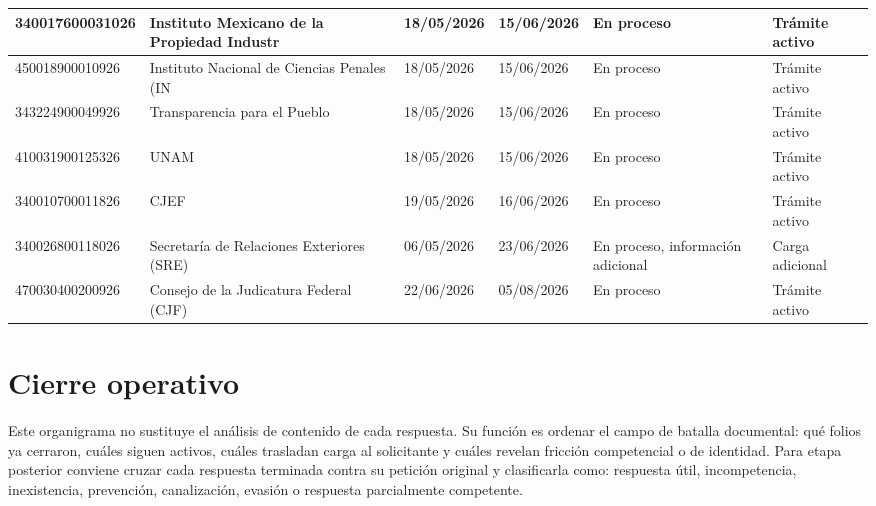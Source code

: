 \documentclass[10pt,letterpaper]{article}
\begin{document}
\begin{longtable}{|p{3.0cm}|p{4.2cm}|p{2.2cm}|p{2.2cm}|p{3.8cm}|p{4.2cm}|}
340017600031026 & Instituto Mexicano de la Propiedad Industr & 18/05/2026 & 15/06/2026 & En proceso & Trámite activo \\ \hline
450018900010926 & Instituto Nacional de Ciencias Penales (IN & 18/05/2026 & 15/06/2026 & En proceso & Trámite activo \\ \hline
343224900049926 & Transparencia para el Pueblo & 18/05/2026 & 15/06/2026 & En proceso & Trámite activo \\ \hline
410031900125326 & UNAM & 18/05/2026 & 15/06/2026 & En proceso & Trámite activo \\ \hline
340010700011826 & CJEF & 19/05/2026 & 16/06/2026 & En proceso & Trámite activo \\ \hline
340026800118026 & Secretaría de Relaciones Exteriores (SRE) & 06/05/2026 & 23/06/2026 & En proceso, información adicional & Carga adicional \\ \hline
470030400200926 & Consejo de la Judicatura Federal (CJF) & 22/06/2026 & 05/08/2026 & En proceso & Trámite activo \\ \hline
\end{longtable}

\section*{Cierre operativo}
Este organigrama no sustituye el análisis de contenido de cada respuesta. Su función es ordenar el campo de batalla documental: qué folios ya cerraron, cuáles siguen activos, cuáles trasladan carga al solicitante y cuáles revelan fricción competencial o de identidad. Para etapa posterior conviene cruzar cada respuesta terminada contra su petición original y clasificarla como: respuesta útil, incompetencia, inexistencia, prevención, canalización, evasión o respuesta parcialmente competente.
\end{document}
